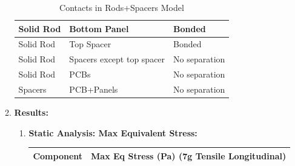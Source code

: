 \documentclass[../../main.tex]{subfiles}
\begin{document}
\begin{enumerate}
\begin{enumerate}
\begin{table}[h!]
\begin{tabular}{|p{4cm}|p{3cm}|p{3cm}|}
                    \hline
                   Solid Rod & Bottom Panel& Bonded \\
                    \hline
                    Solid Rod & Top Spacer & Bonded \\
                    \hline
                    Solid Rod & Spacers except top spacer & No separation \\
                    \hline
                    Solid Rod & PCBs & No separation \\
                    \hline
                    Spacers & PCB+Panels & No separation \\
                    \hline

                \end{tabular}
                \caption{Contacts in Rods+Spacers Model}
                \label{tab:my_label}
            \end{table}
            \item \textbf{Results: }
            \begin{enumerate}
            \item \textbf{Static Analysis: Max Equivalent Stress: }
                \begin{table}[h!]
                    \centering
                    \begin{tabular}{|p{8cm}|p{6cm}|}
                         \hline
                         \textbf{Component} & \textbf{Max Eq Stress (Pa) \newline(7g Tensile Longitudinal)} \\
                         \hline
                         

\end{tabular}
\end{table}
\end{enumerate}
\end{enumerate}
\end{enumerate}
\end{document}
